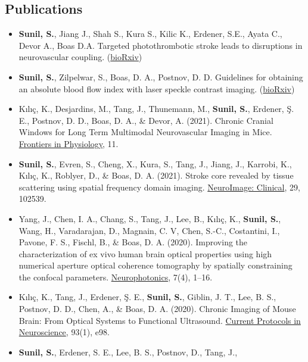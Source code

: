 \documentclass[
  letterpaper,
  DIV=11,
  numbers=noendperiod]{scrartcl}
\providecommand{\tightlist}{%
  \setlength{\itemsep}{0pt}\setlength{\parskip}{0pt}}\usepackage{longtable,booktabs,array}
\begin{document}
\hypertarget{publications}{%
\subsection{Publications}\label{publications}}

\begin{itemize}
\tightlist
\item
  \textbf{Sunil, S.}, Jiang J., Shah S., Kura S., Kilic K., Erdener,
  S.E., Ayata C., Devor A., Boas D.A. Targeted photothrombotic stroke
  leads to disruptions in neurovascular coupling.
  (\href{https://www.biorxiv.org/content/10.1101/2022.01.22.477341v1}{bioRxiv})
\item
  \textbf{Sunil, S.}, Zilpelwar, S., Boas, D. A., Postnov, D. D.
  Guidelines for obtaining an absolute blood flow index with laser
  speckle contrast imaging.
  (\href{https://www.biorxiv.org/content/10.1101/2021.04.02.438198v1}{bioRxiv})
\item
  Kılıç, K., Desjardins, M., Tang, J., Thunemann, M., \textbf{Sunil,
  S.}, Erdener, Ş. E., Postnov, D. D., Boas, D. A., \& Devor, A. (2021).
  Chronic Cranial Windows for Long Term Multimodal Neurovascular Imaging
  in Mice. \href{https://doi.org/10.3389/fphys.2020.612678}{Frontiers in
  Physiology}, 11.
\item
  \textbf{Sunil, S.}, Evren, S., Cheng, X., Kura, S., Tang, J., Jiang,
  J., Karrobi, K., Kılıç, K., Roblyer, D., \& Boas, D. A. (2021). Stroke
  core revealed by tissue scattering using spatial frequency domain
  imaging. \href{https://doi.org/10.1016/j.nicl.2020.102539}{NeuroImage:
  Clinical}, 29, 102539.
\item
  Yang, J., Chen, I. A., Chang, S., Tang, J., Lee, B., Kılıç, K.,
  \textbf{Sunil, S.}, Wang, H., Varadarajan, D., Magnain, C. V, Chen,
  S.-C., Costantini, I., Pavone, F. S., Fischl, B., \& Boas, D. A.
  (2020). Improving the characterization of ex vivo human brain optical
  properties using high numerical aperture optical coherence tomography
  by spatially constraining the confocal parameters.
  \href{https://doi.org/10.1117/1.NPh.7.4.045005}{Neurophotonics}, 7(4),
  1--16.
\item
  Kılıç, K., Tang, J., Erdener, Ş. E., \textbf{Sunil, S.}, Giblin, J.
  T., Lee, B. S., Postnov, D. D., Chen, A., \& Boas, D. A. (2020).
  Chronic Imaging of Mouse Brain: From Optical Systems to Functional
  Ultrasound. \href{https://doi.org/10.1002/cpns.98}{Current Protocols
  in Neuroscience}, 93(1), e98.
\item
  \textbf{Sunil, S.}, Erdener, S. E., Lee, B. S., Postnov, D., Tang, J.,

\end{itemize}
\end{document}
